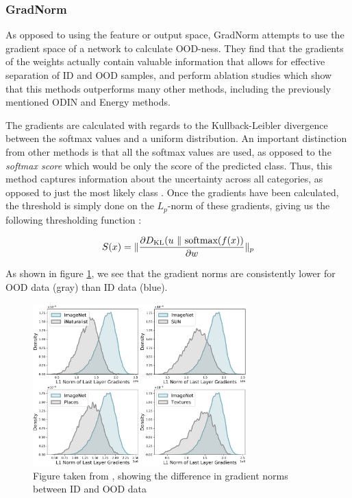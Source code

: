 \documentclass[conference,onecolumn]{IEEEtran}
\begin{document}
\subsubsection{GradNorm}

As opposed to using the feature or output space, GradNorm \cite{gradnorm} attempts to use the gradient space of a network to calculate OOD-ness. They find that the gradients of the weights actually contain valuable information that allows for effective separation of ID and OOD samples, and perform ablation studies which show that this methods outperforms many other methods, including the previously mentioned ODIN and Energy methods.

The gradients are calculated with regards to the Kullback-Leibler divergence between the softmax values and a uniform distribution. An important distinction from other methods is that all the softmax values are used, as opposed to the {\it softmax score} which would be only the score of the predicted class. Thus, this method captures information about the uncertainty across all categories, as opposed to just the most likely class \cite[3]{gradnorm}. Once the gradients have been calculated, the threshold is simply done on the $L_p$-norm of these gradients, giving us the following thresholding function \cite{gradnorm}:

\begin{equation}
\label{eq:score}
    S(\*x) = \lVert\frac{\partial D_\text{KL}(\*u~\lVert~\text{softmax}(f(\*x))}{\partial \*w}  \rVert_p
\end{equation}

As shown in figure \ref{gradnorms}, we see that the gradient norms are consistently lower for OOD data (gray) than ID data (blue).

\begin{figure}[h]
\centerline{\includegraphics[width=3.25in]{figure/gradnorm.pdf}}
\caption{Figure taken from \cite{gradnorm}, showing the difference in gradient norms between ID and OOD data}
\label{gradnorms}
\end{figure}
\end{document}
